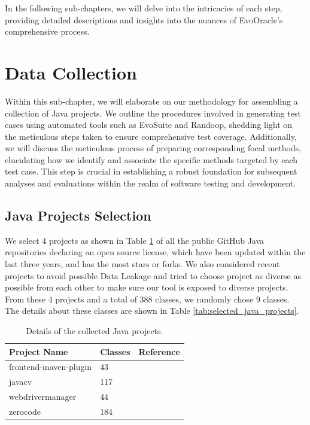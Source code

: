 In the following sub-chapters, we will delve into the intricacies of each step, providing detailed descriptions and insights into the nuances of EvoOracle's comprehensive process.

\section{Data Collection}
\label{sec:data_collection}
\vspace{0.2 cm}
Within this sub-chapter, we will elaborate on our methodology for assembling a collection of Java projects. We outline the procedures involved in generating test cases using automated tools such as EvoSuite and Randoop, shedding light on the meticulous steps taken to ensure comprehensive test coverage. Additionally, we will discuss the meticulous process of preparing corresponding focal methods, elucidating how we identify and associate the specific methods targeted by each test case. This step is crucial in establishing a robust foundation for subsequent analyses and evaluations within the realm of software testing and development.

\vspace{0.1 cm}
\subsection{Java Projects Selection}
\label{sec:projects_selection}
\vspace{0.1 cm}

We select 4 projects as shown in Table \ref{tab:collected_java_projects} of all the public GitHub Java repositories declaring an open source license, which have been updated within the last three years, and has the most stars or forks. We also considered recent projects to avoid possible Data Leakage and tried to choose project as diverse as possible from each other to make sure our tool is exposed to diverse projects. From these 4 projects and a total of 388 classes, we randomly chose 9 classes. The details about these classes are shown in Table \ref{tab:selected_java_projects}.

\begin{table}
    \centering
    \begin{tabular}{l | l | r}
        \textbf{Project Name} & \textbf{Classes} & \textbf{Reference} \\
        \hline
        frontend-maven-plugin & 43 & \cite{sletteberg_frontend-maven-plugin_2023} \\
        javacv & 117 & \cite{noauthor_bytedecojavacv_nodate} \\
        webdrivermanager & 44 & \cite{noauthor_bonigarciawebdrivermanager_nodate} \\
        zerocode & 184 & \cite{noauthor_authorjappszerocode_nodate} \\
    \end{tabular}
\caption{Details of the collected Java projects.}
\label{tab:collected_java_projects}
\end{table}

